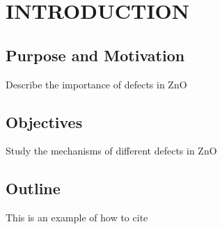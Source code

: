\addchapheadtotoc
\chapter{INTRODUCTION}
\section{Purpose and Motivation}
Describe the importance of defects in ZnO
\section{Objectives}
Study the mechanisms of different defects in ZnO
\section{Outline}

This is an example of how to cite \citep{Prades2009}
